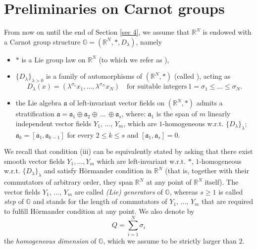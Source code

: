 \documentclass{article}
\numberwithin{equation}{section}
\begin{document}
\section{Preliminaries on Carnot groups}
\label{sec 2}
From now on until the end of Section \ref{sec 4}, we assume that $\mathbb{R}^N$ is endowed with a Carnot group structure $\mathbb{G}=(\mathbb{R}^N, *, D_{\lambda})$, namely
\begin{itemize}
    \item [(i)] $*$ is a Lie group law on $\mathbb{R}^N$ (to which we refer as ),
    \item [(ii)] $\{D_{\lambda}\}_{\lambda>0}$ is a family of automorphisms of $(\mathbb{R}^N,*)$ (called ), acting as
    \begin{equation*}
        D_{\lambda}(x)=(\lambda^{\sigma_1} x_1,..., \lambda^{\sigma_N} x_N) \quad \text{for suitable integers} \: 1 = \sigma_1 \leq ... \leq \sigma_N.
    \end{equation*}
    \item [(iii)] the Lie algebra $\mathfrak{a}$ of left-invariant vector fields on $(\mathbb{R}^N,*)$ admits a stratification $\mathfrak{a}=\mathfrak{a}_1 \oplus \mathfrak{a}_2 \oplus \, ... \, \oplus \mathfrak{a}_s$, where: $\mathfrak{a}_1$ is the span of $m$ linearly independent vector fields $Y_1, \, ..., \, Y_m$, which are $1$-homogeneous w.r.t. $\{D_{\lambda}\}_{\lambda}$; $\mathfrak{a}_k = [\mathfrak{a}_1, \mathfrak{a}_{k-1}]$ for every $2 \leq k \leq s$ and $[\mathfrak{a}_1, \mathfrak{a}_s]=0$.
\end{itemize}
We recall that condition (iii) can be equivalently stated by asking that there exist smooth vector fields $Y_1,..., Y_m$ which are left-invariant w.r.t. $*$, $1$-homogeneous w.r.t. $\{D_{\lambda}\}_{\lambda}$ and satisfy Hörmander condition in $\mathbb{R}^N$ (that is, together with their commutators of arbitrary order, they span $\mathbb{R}^N$ at any point of $\mathbb{R}^N$ itself).
The vector fields $Y_1, \, ..., \, Y_m$ are called \emph{(Lie) generators} of $\mathbb{G}$, whereas $s \geq 1$ is called \emph{step} of $\mathbb{G}$ and stands for the length of commutators of $Y_1, \, ..., \, Y_m$ that are required to fulfill Hörmander condition at any point. 
We also denote by
\begin{equation*}
    Q = \sum_{i=1}^N \sigma_i
\end{equation*}
the \emph{homogeneous dimension} of $\mathbb{G}$, which we assume to be strictly larger than $2$.
\end{document}
